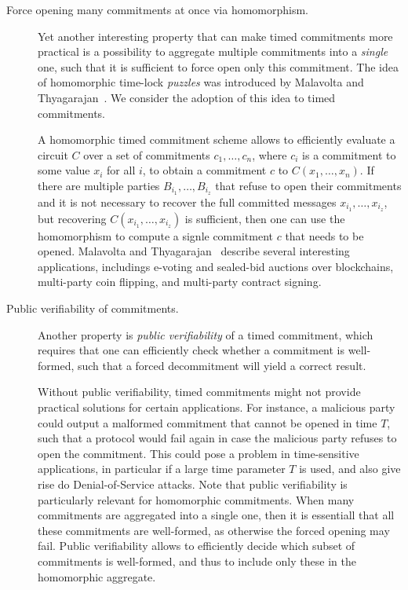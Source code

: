 \begin{description}
	

	\item[Force opening many commitments at once via homomorphism.] 
	Yet another interesting property that can make timed commitments more practical is a possibility to aggregate multiple commitments into a \emph{single} one, such that it is sufficient to force open only this commitment. The idea of homomorphic time-lock \emph{puzzles} was introduced by Malavolta and Thyagarajan~\cite{C:MalThy19}. We consider the adoption of this idea to timed commitments. 

	A homomorphic timed commitment scheme allows to efficiently evaluate a circuit $C$ over a set of commitments $c_1, \ldots, c_n$, where $c_i$ is a commitment to some value $x_i$ for all $i$, to obtain a commitment $c$ to $C(x_1, \ldots, x_n)$. 
	If there are multiple parties $B_{i_1}, \ldots, B_{i_z}$ that refuse to open their commitments and it is not necessary to recover the full committed messages $x_{i_1}, \ldots, x_{i_z}$, but recovering $C(x_{i_1}, \ldots, x_{i_z})$ is sufficient, then one can use the homomorphism to compute a signle commitment $c$ that needs to be opened. Malavolta and Thyagarajan~\cite{C:MalThy19} describe several interesting applications, includings e-voting and sealed-bid auctions over blockchains, multi-party coin flipping, and multi-party contract signing.

	\item[Public verifiability of commitments.] 
	Another property is \emph{public verifiability} of a timed commitment, which requires that one can efficiently check whether a commitment is well-formed, such that a forced decommitment will yield a correct result. 

	Without public verifiability, timed commitments might not provide practical solutions for certain applications. For instance, a malicious party could output a malformed commitment that cannot be opened in time $T$, such that a protocol would fail again in case the malicious party refuses to open the commitment. This could pose a problem in time-sensitive applications, in particular if a large time parameter $T$ is used, and also give rise do Denial-of-Service attacks.
	Note that public verifiability is particularly relevant for homomorphic commitments. When many commitments are aggregated into a single one, then it is essentiall that all these commitments are well-formed, as otherwise the forced opening may fail. Public verifiability allows to efficiently decide which subset of commitments is well-formed, and thus to include only these in the homomorphic aggregate.


\end{description}
